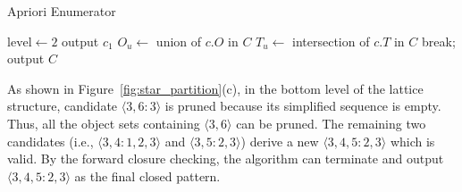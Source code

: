 \begin{algorithm}[h]
\caption{Apriori Enumerator}
\label{algo:apriori_mining}
\begin{algorithmic}[1]
 \label{code:init-start}
 \label{code:simp1}
\EndIf 
\EndFor\label{code:init-end}
\State $\mathrm{level} \gets 2$ \label{code:level}
 \label{code:level-start}
		\label{code:join-start}	
			 \label{code:join}			
			 \label{code:simp2}
			\EndIf			
		\EndFor\label{code:join-end}
		 \label{code:output1-start}
				\State output $c_1$
			\EndIf
		\EndIf \label{code:output1-end}
	\EndFor
%	
	\State $O_u \gets $ union of $c.O$ in $C$	\label{code:fc-checking-start}
	\State $T_u \gets $ intersection of $c.T$ in $C$	
		 \label{code:fc-checking}
		\State break;
	\EndIf \label{code:fc-checking-end}
\EndWhile\label{code:level-ends}
\State output $C$ \label{code:output2-end}
\end{algorithmic}
\end{algorithm}



\begin{example}
As shown in Figure~\ref{fig:star_partition}(c), in the bottom level of the lattice structure, candidate $\langle 3,6:3 \rangle $ is pruned because its simplified sequence is empty. Thus, all the object sets containing $\langle 3,6 \rangle $ can be pruned. The remaining two candidates (i.e., $\langle 3,4:1,2,3 \rangle$ and $\langle 3,5:2,3 \rangle$)  derive a new  $\langle 3,4,5:2,3 \rangle$ which is valid. By the forward closure checking, the algorithm can terminate and output $\langle 3,4,5:2,3 \rangle$ as the final closed pattern.
\end{example}




